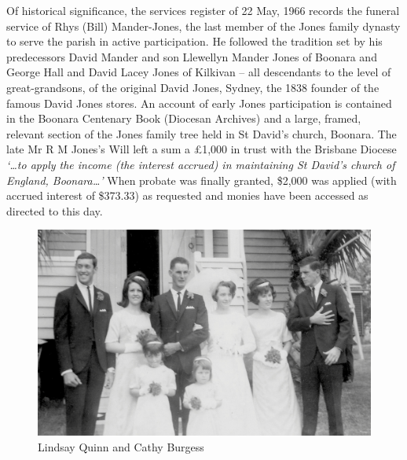 Of historical significance, the services register of 22 May, 1966 records the funeral service of Rhys (Bill) Mander-Jones, the last member of the Jones family dynasty to serve the parish in active participation. He followed the tradition set by his predecessors David Mander and son Llewellyn Mander Jones of Boonara and George Hall and David Lacey Jones of Kilkivan -- all descendants to the level of great-grandsons, of the original David Jones, Sydney, the 1838 founder of the famous David Jones stores. An account of early Jones participation is contained in the Boonara Centenary Book (Diocesan Archives) and a large, framed, relevant section of the Jones family tree held in St David's church, Boonara. The late Mr R M Jones's Will left a sum a \pounds1,000 in trust with the Brisbane Diocese \emph{`\ldots to apply the income (the interest accrued) in maintaining St David's church of England, Boonara\ldots'} When probate was finally granted, \$2,000 was applied (with accrued interest of \$373.33) as requested and monies have been accessed as directed to this day.









\begin{figure}[!htb]
\begin{center}
\includegraphics[width=1.\textwidth,center]{../images/LindsayQuinnCathyBurgessWedding.jpg}
\caption{Lindsay Quinn and Cathy Burgess}
\end{center}
\end{figure}




